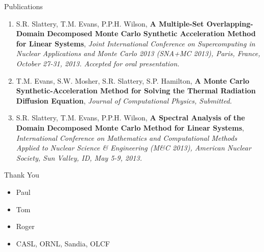 \documentclass{beamer}
\begin{document}
\begin{frame}{Publications}

  \small{
    \begin{enumerate}
    \item S.R. Slattery, T.M. Evans, P.P.H. Wilson, \textbf{A
      Multiple-Set Overlapping-Domain Decomposed Monte Carlo Synthetic
      Acceleration Method for Linear Systems}, \textit{Joint
      International Conference on Supercomputing in Nuclear
      Applications and Monte Carlo 2013 (SNA+MC 2013), Paris, France,
      October 27-31, 2013. Accepted for oral presentation.}
      \medskip
    \item T.M. Evans, S.W. Mosher, S.R. Slattery, S.P. Hamilton,
      \textbf{A Monte Carlo Synthetic-Acceleration Method for Solving
        the Thermal Radiation Diffusion Equation}, \textit{Journal of
        Computational Physics, Submitted.}
      \medskip
    \item S.R. Slattery, T.M. Evans, P.P.H. Wilson, \textbf{A Spectral
      Analysis of the Domain Decomposed Monte Carlo Method for Linear
      Systems}, \textit{International Conference on Mathematics and
      Computational Methods Applied to Nuclear Science \& Engineering
      (M\&C 2013), American Nuclear Society, Sun Valley, ID, May 5-9,
      2013.}
    \end{enumerate}
  }
\end{frame}

\begin{frame}{Thank You}

  \begin{itemize}
  \item Paul
  \item Tom
  \item Roger
  \item CASL, ORNL, Sandia, OLCF
\end{itemize}

\end{frame}

\end{document}
